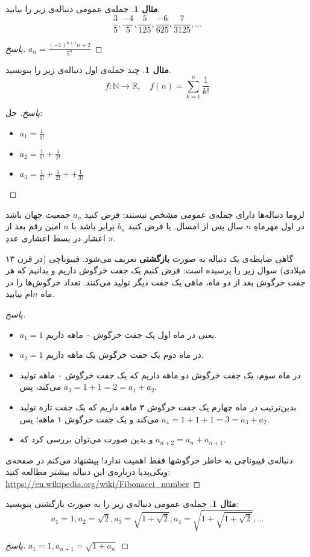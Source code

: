 \documentclass[12pt,a4paper]{article}
\theoremstyle{definition}
\newtheorem{mesal}[thm]{مثال}
\begin{document}
\begin{mesal}
جمله‌ی عمومی دنباله‌ی زیر را بیابید.
\[\frac{3}{5},\frac{-4}{5},\frac{5}{125},\frac{-6}{625},\frac{7}{3125},...\]
\end{mesal}
\begin{proof}[پاسخ]
$a_n=\frac{(-1)^{n+1}n+2}{5^n}$
\end{proof}
\begin{mesal}
چند جمله‌ی اول دنباله‌ی زیر را بنویسید.
\[f:\mathbb{N} \to \mathbb{R},\quad 
 f(n)=\sum^n_{k=1} \frac{1}{k!}\]
\end{mesal}
\begin{proof}[پاسخ]
حل:
\begin{itemize}
\item
$a_1=\frac{1}{1!}$
\item
$a_2=\frac{1}{1!}+\frac{1}{2!}$
\item
$a_3=\frac{1}{1!}+\frac{1}{2!}++\frac{1}{3!}$
\end{itemize}
\end{proof}
لزوما دنباله‌ها دارای جمله‌ی عمومی مشخص نیستند: فرض کنید
$a_n$
جمعیت جهان باشد در اول مهرماهِ
$n$
سال پس از امسال. یا فرض کنید
$b_n$
برابر باشد با
$n$
امین رقم بعد از اعشار در بسط 
اعشاری
عددِ
$\pi$.
\par 
گاهی ضابطه‌ی یک دنباله به صورت \textbf{بازگشتی} تعریف می‌شود.
فیبوناچی (در قرن ۱۳ میلادی) سوال زیر را پرسیده است:
فرض کنیم یک جفت خرگوش داریم و بدانیم که هر جفت خرگوش بعد از دو ماه، ماهی یک جفت دیگر تولید می‌کنند. تعداد خرگوش‌ها را در ماه 
$n$ام
 بیابید.
\begin{proof}[پاسخ]
\hfill 
\begin{itemize}
\item 
$a_1=1$
یعنی در ماه اول یک جفت خرگوش ۰ ماهه داریم.
\item 
$a_2=1$
در ماه دوم یک جفت خرگوش یک ماهه داریم.
\item 
در ماه سوم، یک جفت خرگوش دو ماهه داریم که یک جفت خرگوش ۰ ماهه تولید می‌کند، پس
$a_3=1+1=2=a_1+a_2$.
\item 
بدین‌ترتیب در ماه چهارم
یک جفت خرگوش ۳ ماهه داریم که یک جفت تازه تولید می‌کند و یک جفت خرگوش ۱ ماهه؛ پس
$a_4=1+1+1=3=a_3+a_2$.
\item 
و بدین صورت می‌توان بررسی کرد که
$a_{n+2}=a_{n}+a_{n+1}$.
\end{itemize}
دنباله‌ی فیبوناچی به خاطر خرگوشها فقط اهمیت ندارد!‌
پیشنهاد می‌کنم در صفحه‌ی ویکی‌پدیا درباره‌ی این دنباله بیشتر مطالعه کنید:
\url{https://en.wikipedia.org/wiki/Fibonacci_number}
\end{proof}
\begin{mesal}
جمله‌ی عمومی دنباله‌ی زیر را به صورت بازگشتی بنویسید:
\[
a_1=1, a_2=\sqrt{2}, a_3=\sqrt{1+\sqrt{2}}, a_4=\sqrt{1+\sqrt{1+\sqrt{2}}}, \ldots\]
\end{mesal}
\begin{proof}[پاسخ]
$a_1 = 1, a_{n+1}=\sqrt{1+a_n} $
\end{proof}
\end{document}
